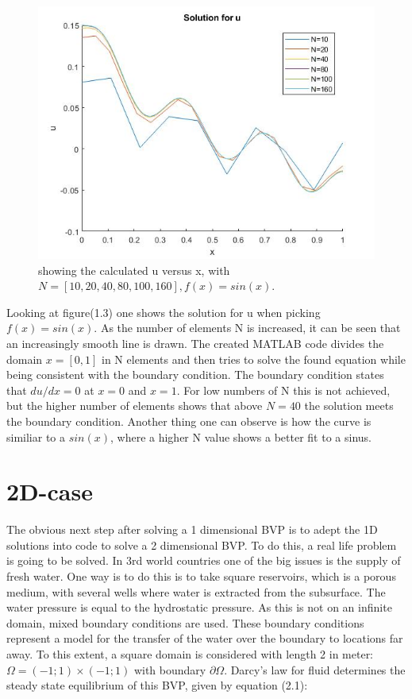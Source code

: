 \documentclass[a4paper]{report}
\begin{document}
\newpage

\begin{figure}[ht!]
	\centering
	\includegraphics[width=150mm]{1Dfsinx.jpg}
	\caption{showing the calculated u versus x, with  $N =[10, 20, 40, 80, 100, 160],f(x)=sin(x)$. 
	\label{overflow}}
\end{figure}

Looking at figure(1.3) one shows the solution for u when picking $f(x)=sin(x)$. As the number of elements N is increased, it can be seen that an increasingly smooth line is drawn. The created MATLAB code divides the domain $x=[0,1]$ in N elements and then tries to solve the found equation while being consistent with the boundary condition. The boundary condition states that $du/dx =0$ at $x=0$ and $x=1$. For low numbers of N this is not achieved, but the higher number of elements shows that above $N=40$ the solution meets the boundary condition. Another thing one can observe is how the curve is similiar to a $sin(x)$, where a higher N value shows a better fit to a sinus.


\chapter{2D-case}


The obvious next step after solving a 1 dimensional BVP is to adept the 1D solutions into code to solve a 2 dimensional BVP. To do this, a real life problem is going to be solved. In 3rd world countries one of the big issues is the supply of fresh water. One way is to do this is to take square reservoirs, which is a porous medium, with several wells where water is extracted from the subsurface. The water pressure is equal to the hydrostatic pressure. As this is not on an infinite domain, mixed boundary conditions are used. These boundary conditions represent a model for the transfer of the water over the boundary to locations far away. To this extent, a square domain is considered with length 2 in meter: $\Omega= (-1; 1) \times (-1; 1)$ with boundary $\partial\Omega$. Darcy's law for fluid determines the steady state equilibrium of this BVP, given by equation (2.1):
\end{document}
